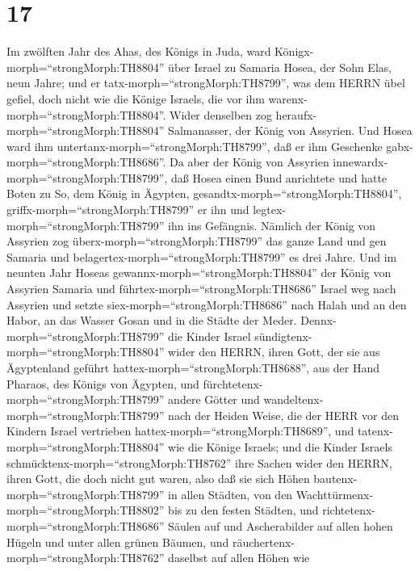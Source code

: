 \hypertarget{section-16}{%
\section{17}\label{section-16}}

 Im zwölften Jahr des Ahas, des Königs in Juda, ward
Königx-morph=``strongMorph:TH8804'' über Israel zu Samaria Hosea, der
Sohn Elas, neun Jahre;  und er
tatx-morph=``strongMorph:TH8799'', was dem HERRN übel gefiel, doch nicht
wie die Könige Israels, die vor ihm warenx-morph=``strongMorph:TH8804''.
 Wider denselben zog heraufx-morph=``strongMorph:TH8804''
Salmanasser, der König von Assyrien. Und Hosea ward ihm
untertanx-morph=``strongMorph:TH8799'', daß er ihm Geschenke
gabx-morph=``strongMorph:TH8686''.  Da aber der König von
Assyrien innewardx-morph=``strongMorph:TH8799'', daß Hosea einen Bund
anrichtete und hatte Boten zu So, dem König in Ägypten,
gesandtx-morph=``strongMorph:TH8804'',
griffx-morph=``strongMorph:TH8799'' er ihn und
legtex-morph=``strongMorph:TH8799'' ihn ins Gefängnis. 
Nämlich der König von Assyrien zog überx-morph=``strongMorph:TH8799''
das ganze Land und gen Samaria und
belagertex-morph=``strongMorph:TH8799'' es drei Jahre.  Und
im neunten Jahr Hoseas gewannx-morph=``strongMorph:TH8804'' der König
von Assyrien Samaria und führtex-morph=``strongMorph:TH8686'' Israel weg
nach Assyrien und setzte siex-morph=``strongMorph:TH8686'' nach Halah
und an den Habor, an das Wasser Gosan und in die Städte der Meder.
 Dennx-morph=``strongMorph:TH8799'' die Kinder Israel
sündigtenx-morph=``strongMorph:TH8804'' wider den HERRN, ihren Gott, der
sie aus Ägyptenland geführt hattex-morph=``strongMorph:TH8688'', aus der
Hand Pharaos, des Königs von Ägypten, und
fürchtetenx-morph=``strongMorph:TH8799'' andere Götter  und
wandeltenx-morph=``strongMorph:TH8799'' nach der Heiden Weise, die der
HERR vor den Kindern Israel vertrieben
hattex-morph=``strongMorph:TH8689'', und
tatenx-morph=``strongMorph:TH8804'' wie die Könige Israels; 
und die Kinder Israels schmücktenx-morph=``strongMorph:TH8762'' ihre
Sachen wider den HERRN, ihren Gott, die doch nicht gut waren, also daß
sie sich Höhen bautenx-morph=``strongMorph:TH8799'' in allen Städten,
von den Wachttürmenx-morph=``strongMorph:TH8802'' bis zu den festen
Städten,  und richtetenx-morph=``strongMorph:TH8686''
Säulen auf und Ascherabilder auf allen hohen Hügeln und unter allen
grünen Bäumen,  und
räuchertenx-morph=``strongMorph:TH8762'' daselbst auf allen Höhen wie
